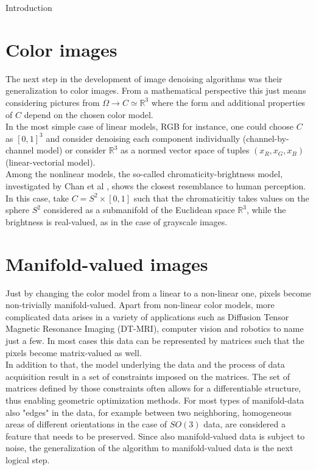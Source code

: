 \begin{chapter}{Introduction}


\section{Color images}
The next step in the development of image denoising algorithms was their generalization to color images. From a mathematical perspective this just means considering pictures
from $\Omega\to C\simeq \mathbb{R}^3$ where the form and additional properties of $C$ depend on the chosen color model. \\
In the most simple case of linear models, RGB for instance, one could choose $C$ as $[0,1]^3$ and consider denoising each component individually (channel-by-channel model)
or consider $\mathbb{R}^3$ as a normed vector space of tuples $(x_R, x_G, x_B)$ (linear-vectorial model).\\
Among the nonlinear models, the so-called chromaticity-brightness model, investigated by Chan et al \cite{Chan}, shows the closest resemblance to human perception.
In this case, take $C=S^2\times [0,1]$ such that the chromaticitiy takes values on the sphere $S^2$ considered as a submanifold of the Euclidean space $\mathbb{R}^3$, 
while the brightness is real-valued, as in the case of grayscale images.

\section{Manifold-valued images} %
\label{sec:Manifold-valued Images}
Just by changing the color model from a linear to a non-linear one, pixels become non-trivially manifold-valued.
Apart from non-linear color models, more complicated data arises in a variety of applications such as Diffusion Tensor Magnetic Resonance Imaging (DT-MRI), computer vision and robotics to name just a few. In most cases this data can
be represented by matrices such that the pixels become matrix-valued as well.\\

In addition to that, the model underlying
the data and the process of data acquisition result in a set of constraints imposed on the matrices. The set of matrices
defined by those constraints often allows for a differentiable structure, thus enabling geometric optimization methods.
For most types of manifold-data also "edges" in the data, for example between two neighboring, homogeneous areas of 
different orientations in the case of $SO(3)$ data, are considered a feature that needs to be preserved.
Since also manifold-valued data is subject to noise, the generalization of the algorithm to manifold-valued data is the
next logical step.



\end{chapter}
